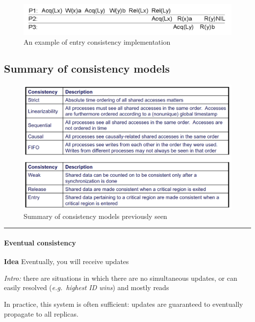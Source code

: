 \begin{figure}[htbp]
    \centering
    \includegraphics{src/images/consistency-replication/entry-consistency.png}
    \caption{An example of entry consistency implementation}
\end{figure}

\subsection{Summary of consistency models}

\begin{figure}[htbp]
    \centering
    \includegraphics{src/images/consistency-replication/summary.png}
    \caption{Summary of consistency models previously seen}
\end{figure}

\begin{center}\rule{3in}{0.4pt}\end{center}

\paragraph{Eventual consistency}

\textbf{Idea} Eventually, you will receive updates

\emph{Intro:} there are situations in which there are no simultaneous
updates, or can easily resolved (\emph{e.g.~highest ID wins}) and mostly
reads

In practice, this system is often sufficient: updates are guaranteed to
eventually propagate to all replicas.

